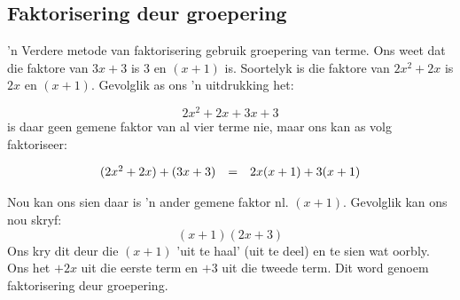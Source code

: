 \subsection{Faktorisering deur groepering}
\nopagebreak

’n Verdere metode van faktorisering gebruik groepering van terme. Ons weet dat die faktore van $3x+3$ is $3$ en $(x+1)$ is. Soortelyk is die faktore van $2{x}^{2}+2x$ is $2x$ en $(x+1)$. Gevolglik as ons ’n uitdrukking het:

\begin{equation*}
2{x}^{2}+2x+3x+3
\end{equation*}
is daar geen gemene faktor van al vier terme nie, maar ons kan as volg faktoriseer:
\nopagebreak\noindent{}

\begin{equation*}
\begin{array}{ccl}
(2{x}^{2}+2x)+(3x+3) &=& 2x(x+1)+3(x+1) \hfill \hfill
\end{array}
\end{equation*}


Nou kan ons sien daar is ’n ander gemene faktor nl. $(x+1)$. Gevolglik kan ons nou skryf: 
\begin{equation*}
(x+1)(2x+3)
\end{equation*}
Ons kry dit deur die $(x+1)$ ’uit te haal’ (uit te deel) en te sien wat oorbly. Ons het $+2x$ uit die eerste term en $+3$ uit die tweede term. Dit word genoem faktorisering deur groepering.\par 




